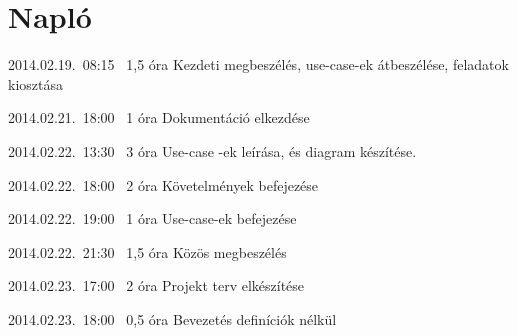 %
\section{Napló}

\begin{naplo}

\bejegyzes
{2014.02.19.~08:15~}
{1,5 óra}
{\adam\newline
\antal\newline
\bator\newline
\torok}
{Kezdeti megbeszélés, use-case-ek átbeszélése, feladatok kiosztása}

\bejegyzes
{2014.02.21.~18:00~} %
{1 óra} %
{\antal} %
{Dokumentáció elkezdése} %

\bejegyzes
{2014.02.22.~13:30~}
{3 óra}
{\adam}
{Use-case -ek leírása, és diagram készítése.}

\bejegyzes
{2014.02.22.~18:00~}
{2 óra}
{\bator}
{Követelmények befejezése}

\bejegyzes
{2014.02.22.~19:00~}
{1 óra}
{\adam}
{Use-case-ek befejezése}

\bejegyzes
{2014.02.22.~21:30~}
{1,5 óra}
{\adam\newline
\antal\newline
\bator\newline
\torok}
{Közös megbeszélés}

\bejegyzes
{2014.02.23.~17:00~}
{2 óra}
{\bator}
{Projekt terv elkészítése}

\bejegyzes
{2014.02.23.~18:00~}
{0,5 óra}
{\antal}
{Bevezetés definíciók nélkül}

\end{naplo}
